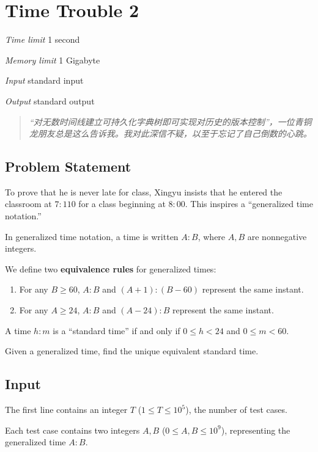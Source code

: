 \section[J. Time Trouble 2]{ Time Trouble 2}

\textit{Time limit}   1 second

\textit{Memory limit} 1 Gigabyte

\textit{Input} \qquad standard input

\textit{Output} \qquad standard output


\begin{quote}
	\textit{``对无数时间线建立可持久化字典树即可实现对历史的版本控制''，一位青铜龙朋友总是这么告诉我。我对此深信不疑，以至于忘记了自己倒数的心跳。}
\end{quote}

\subsection{Problem Statement}

To prove that he is never late for class, Xingyu insists that he entered the classroom at $7{:}110$ for a class beginning at $8{:}00$. This inspires a ``generalized time notation.''

In generalized time notation, a time is written $A{:}B$, where $A,B$ are nonnegative integers.

We define two \textbf{equivalence rules} for generalized times:

\begin{enumerate}
	\item For any $B \ge 60$, $A{:}B$ and $(A+1){:}(B-60)$ represent the same instant.
	\item For any $A \ge 24$, $A{:}B$ and $(A-24){:}B$ represent the same instant.
\end{enumerate}

A time $h{:}m$ is a ``standard time'' if and only if $0 \le h < 24$ and $0 \le m < 60$.

Given a generalized time, find the unique equivalent standard time.

\subsection{Input}

The first line contains an integer $T$ ($1 \le T \le 10^5$), the number of test cases.

Each test case contains two integers $A,B$ ($0 \le A,B \le 10^9$), representing the generalized time $A{:}B$.


